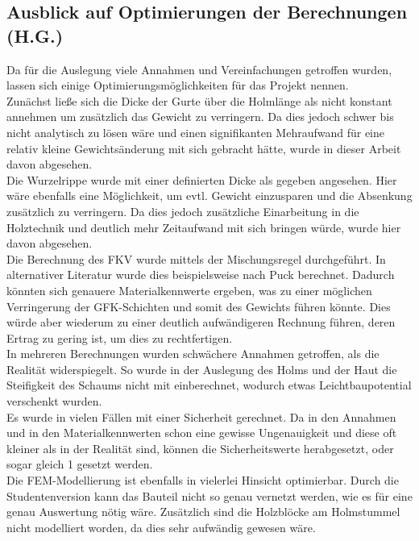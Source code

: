 \subsection{Ausblick auf Optimierungen der Berechnungen (H.G.)}
Da für die Auslegung viele Annahmen und Vereinfachungen getroffen wurden, lassen sich einige Optimierungsmöglichkeiten für das Projekt nennen.\\
\noindent
Zunächst ließe sich die Dicke der Gurte über die Holmlänge als nicht konstant annehmen um zusätzlich das Gewicht zu verringern. Da dies jedoch schwer bis nicht analytisch zu lösen wäre und einen signifikanten Mehraufwand für eine relativ kleine Gewichtsänderung mit sich gebracht hätte, wurde in dieser Arbeit davon abgesehen.\\
\noindent
Die Wurzelrippe wurde mit einer definierten Dicke als gegeben angesehen. Hier wäre ebenfalls eine Möglichkeit, um evtl. Gewicht einzusparen und die Absenkung zusätzlich zu verringern. Da dies jedoch zusätzliche Einarbeitung in die Holztechnik und deutlich mehr Zeitaufwand mit sich bringen würde, wurde hier davon abgesehen.\\
\noindent
Die Berechnung des FKV wurde mittels der Mischungsregel durchgeführt. In alternativer Literatur wurde dies beispielsweise nach Puck berechnet. Dadurch könnten sich genauere Materialkennwerte ergeben, was zu einer möglichen Verringerung der GFK-Schichten und somit des Gewichts führen könnte. Dies würde aber wiederum zu einer deutlich aufwändigeren Rechnung führen, deren Ertrag zu gering ist, um dies zu rechtfertigen.\\
\noindent
In mehreren Berechnungen wurden schwächere Annahmen getroffen, als die Realität widerspiegelt. So wurde in der Auslegung des Holms und der Haut die Steifigkeit des Schaums nicht mit einberechnet, wodurch etwas Leichtbaupotential verschenkt wurden.\\
\noindent
Es wurde in vielen Fällen mit einer Sicherheit gerechnet. Da in den Annahmen und in den Materialkennwerten schon eine gewisse Ungenauigkeit und diese oft kleiner als in der Realität sind, können die Sicherheitswerte herabgesetzt, oder sogar gleich 1 gesetzt werden.\\
\noindent
Die FEM-Modellierung ist ebenfalls in vielerlei Hinsicht optimierbar. Durch die Studentenversion kann das Bauteil nicht so genau vernetzt werden, wie es für eine genau Auswertung nötig wäre. Zusätzlich sind die Holzblöcke am Holmstummel nicht modelliert worden, da dies sehr aufwändig gewesen wäre.\\
\noindent
 
